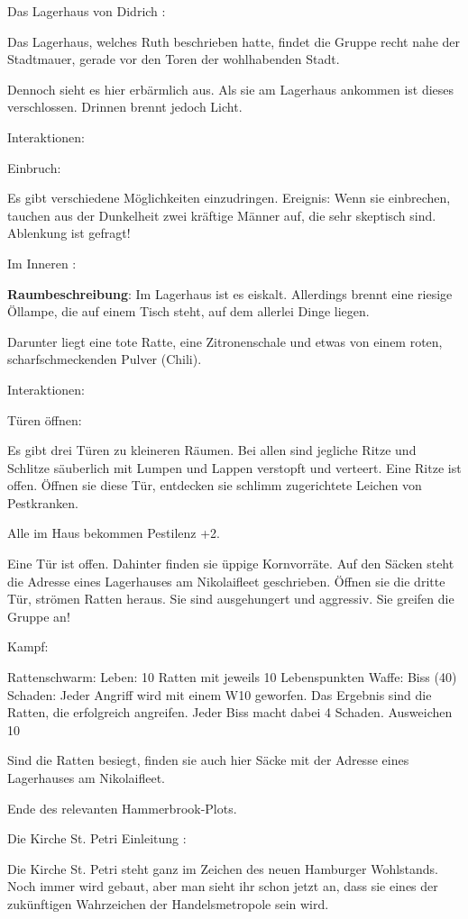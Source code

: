 Das Lagerhaus von Didrich
:

Das Lagerhaus, welches Ruth beschrieben hatte, findet die Gruppe recht nahe der Stadtmauer, gerade vor den Toren der wohlhabenden Stadt.

Dennoch sieht es hier erbärmlich aus. Als sie am Lagerhaus ankommen ist dieses verschlossen. Drinnen brennt jedoch Licht.

Interaktionen:

Einbruch:

Es gibt verschiedene Möglichkeiten einzudringen.
Ereignis: Wenn sie einbrechen, tauchen aus der Dunkelheit zwei kräftige Männer auf, die sehr skeptisch sind. Ablenkung ist gefragt!


Im Inneren
:

\textbf{Raumbeschreibung}: Im Lagerhaus ist es eiskalt. Allerdings brennt eine riesige Öllampe, die auf einem Tisch steht, auf dem allerlei Dinge liegen.

Darunter liegt eine tote Ratte, eine Zitronenschale und etwas von einem roten, scharfschmeckenden Pulver (Chili).

Interaktionen:

Türen öffnen:

Es gibt drei Türen zu kleineren Räumen. Bei allen sind jegliche Ritze und Schlitze säuberlich mit Lumpen und Lappen verstopft und verteert. Eine Ritze ist offen.
Öffnen sie diese Tür, entdecken sie schlimm zugerichtete Leichen von Pestkranken.

Alle im Haus bekommen Pestilenz +2.

Eine Tür ist offen. Dahinter finden sie üppige Kornvorräte. Auf den Säcken steht die Adresse eines Lagerhauses am Nikolaifleet geschrieben.
Öffnen sie die dritte Tür, strömen Ratten heraus. Sie sind ausgehungert und aggressiv. Sie greifen die Gruppe an!

Kampf:

Rattenschwarm:
Leben: 10 Ratten mit jeweils 10 Lebenspunkten
Waffe: Biss (40)
Schaden: Jeder Angriff wird mit einem W10 geworfen. Das Ergebnis sind die Ratten, die erfolgreich angreifen. Jeder Biss macht dabei 4 Schaden.
Ausweichen 10

Sind die Ratten besiegt, finden sie auch hier Säcke mit der Adresse eines Lagerhauses am Nikolaifleet.

Ende des relevanten Hammerbrook-Plots.

Die Kirche St. Petri
Einleitung
:

Die Kirche St. Petri steht ganz im Zeichen des neuen Hamburger Wohlstands. Noch immer wird gebaut, aber man sieht ihr schon jetzt an, dass sie eines der zukünftigen Wahrzeichen der Handelsmetropole sein wird.

